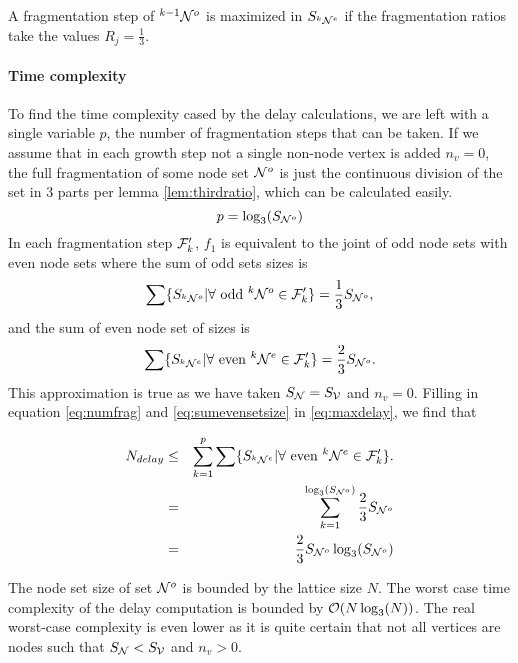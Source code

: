 \begin{lemma}\label{lem:thirdratio}
  A fragmentation step of ${}^{k-1}\mathcal{N}^o$ is maximized in $S_{{}^{k}\mathcal{N}^e}$ if the fragmentation ratios take the values $R_j = \frac{1}{3}$. 
\end{lemma}

\paragraph{Time complexity}

To find the time complexity cased by the delay calculations, we are left with a single variable $p$, the number of fragmentation steps that can be taken. If we assume that in each growth step not a single non-node vertex is added $n_v = 0$, the full fragmentation of some node set $\mathcal{N}^o$ is just the continuous division of the set in 3 parts per lemma \ref{lem:thirdratio}, which can be calculated easily. 
\begin{equation}\label{eq:numfrag}
  p = \log_3(S_{\mathcal{N}^o})
\end{equation}
In each fragmentation step $\mathcal{F}'_k$, $f_1$ is equivalent to the joint of odd node sets with even node sets where the sum of odd sets sizes is 
\begin{equation}\label{eq:sumoddsetsize}
  \sum \{ S_{{}^{k}\mathcal{N}^o} | \forall \mbox{ odd } {}^{k}\mathcal{N}^o \in \mathcal{F}'_k \} = \frac{1}{3}S_{\mathcal{N}^o}, 
\end{equation}
and the sum of even node set of sizes is 
\begin{equation}\label{eq:sumevensetsize}
  \sum \{ S_{{}^{k}\mathcal{N}^e} | \forall \mbox{ even } {}^{k}\mathcal{N}^e \in \mathcal{F}'_k \} = \frac{2}{3}S_{\mathcal{N}^o}. 
\end{equation} 
This approximation is true as we have taken $S_{\mathcal{N}} = S_{\mathcal{V}}$ and $n_v=0$. Filling in equation \ref{eq:numfrag} and \ref{eq:sumevensetsize} in \ref{eq:maxdelay}, we find that

\begin{eqnarray}
\nonumber  N_{delay} &\leq& \sum_{k=1}^{p} \sum \{ S_{{}^{k}\mathcal{N}^e} | \forall \mbox{ even } {}^{k}\mathcal{N}^e \in \mathcal{F}'_k \}. \\
\nonumber   &=& \sum_{k=1}^{\log_3(S_{\mathcal{N}^o})} \frac{2}{3}S_{\mathcal{N}^o} \\
   &=& \frac{2}{3}S_{\mathcal{N}^o}\log_3(S_{\mathcal{N}^o})
\end{eqnarray}

The node set size of set $\mathcal{N}^o$ is bounded by the lattice size $N$. The worst case time complexity of the delay computation is bounded by $\mathcal{O}(N\log_3(N))$. The real worst-case complexity is even lower as it is quite certain that not all vertices are nodes such that $S_{\mathcal{N}} < S_{\mathcal{V}}$ and $n_v > 0$. 

